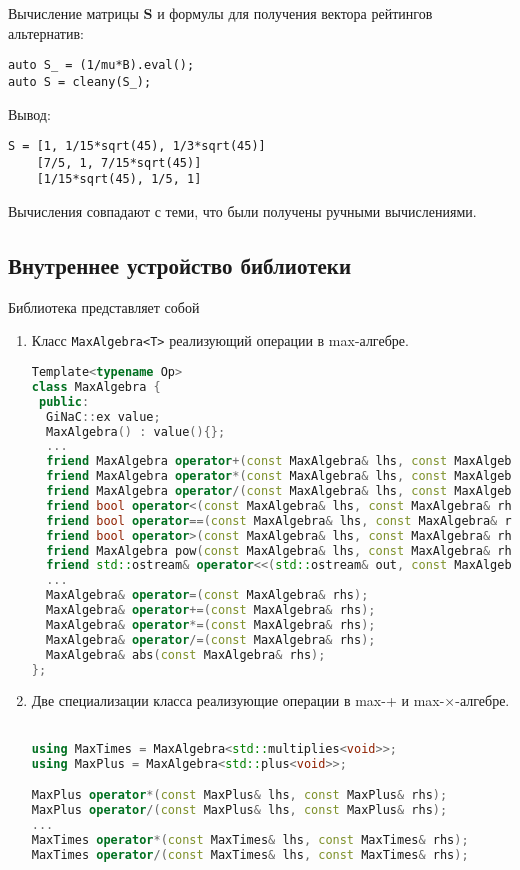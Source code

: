\documentclass[specialist,
	substylefile = spbu_report.rtx,
	subf,href,colorlinks=true, 12pt]{disser}
\begin{document}
Вычисление матрицы $\boldsymbol{S}$ и формулы для получения вектора рейтингов альтернатив:
\begin{verbatim}
auto S_ = (1/mu*B).eval();
auto S = cleany(S_);
\end{verbatim}
Вывод:
\begin{verbatim}
S = [1, 1/15*sqrt(45), 1/3*sqrt(45)]
	[7/5, 1, 7/15*sqrt(45)]
	[1/15*sqrt(45), 1/5, 1]

\end{verbatim}

Вычисления совпадают с теми, что были получены ручными вычислениями.

\subsection{Внутреннее устройство библиотеки}
Библиотека представляет собой
\begin{enumerate}
	\item Класс \texttt{MaxAlgebra<T>} реализующий операции в max-алгебре.

\begin{lstlisting}[language=C++,basicstyle=\footnotesize\ttfamily,keywordstyle=\color{blue}]
Template<typename Op>
class MaxAlgebra {
 public:
  GiNaC::ex value;
  MaxAlgebra() : value(){};
  ...
  friend MaxAlgebra operator+(const MaxAlgebra& lhs, const MaxAlgebra& rhs);
  friend MaxAlgebra operator*(const MaxAlgebra& lhs, const MaxAlgebra& rhs);
  friend MaxAlgebra operator/(const MaxAlgebra& lhs, const MaxAlgebra& rhs);
  friend bool operator<(const MaxAlgebra& lhs, const MaxAlgebra& rhs);
  friend bool operator==(const MaxAlgebra& lhs, const MaxAlgebra& rhs);
  friend bool operator>(const MaxAlgebra& lhs, const MaxAlgebra& rhs);
  friend MaxAlgebra pow(const MaxAlgebra& lhs, const MaxAlgebra& rhs);
  friend std::ostream& operator<<(std::ostream& out, const MaxAlgebra& val);
  ...
  MaxAlgebra& operator=(const MaxAlgebra& rhs);
  MaxAlgebra& operator+=(const MaxAlgebra& rhs);
  MaxAlgebra& operator*=(const MaxAlgebra& rhs);
  MaxAlgebra& operator/=(const MaxAlgebra& rhs);
  MaxAlgebra& abs(const MaxAlgebra& rhs);
};
\end{lstlisting}
\end{enumerate}

\begin{enumerate}
 \setcounter{enumi}{1}
	\item Две специализации класса реализующие операции в max-+ и max-$\times$-алгебре.
\begin{lstlisting}[language=C++,basicstyle=\footnitesize\ttfamily,keywordstyle=\color{blue}]

using MaxTimes = MaxAlgebra<std::multiplies<void>>;
using MaxPlus = MaxAlgebra<std::plus<void>>;

MaxPlus operator*(const MaxPlus& lhs, const MaxPlus& rhs);
MaxPlus operator/(const MaxPlus& lhs, const MaxPlus& rhs);
...
MaxTimes operator*(const MaxTimes& lhs, const MaxTimes& rhs);
MaxTimes operator/(const MaxTimes& lhs, const MaxTimes& rhs);
\end{lstlisting}
\end{enumerate}
\end{document}
